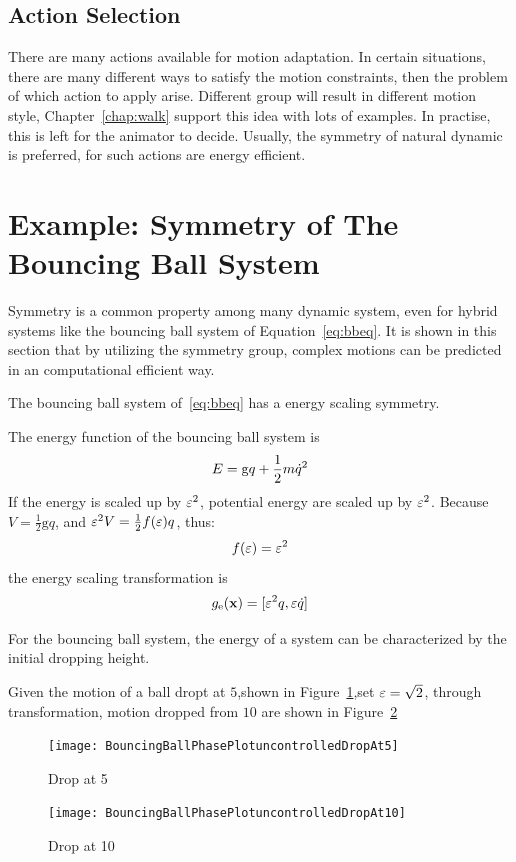 \subsection{Action Selection}
There are many actions available for motion adaptation.
In certain situations, there are many different ways to satisfy the motion constraints, then the problem of which action to apply arise.
Different group will result in different motion style, Chapter~\ref{chap:walk} support this idea with lots of examples.
In practise, this is left for the animator to decide.
Usually, the symmetry of natural dynamic is preferred, for such actions are energy efficient.







\section{Example: Symmetry of The Bouncing Ball System}
\label{sec:symball}
Symmetry is a common property among many dynamic system, even for hybrid systems like the bouncing ball system of Equation~\ref{eq:bbeq}.
It is shown in this section that by utilizing the symmetry group, complex motions can be predicted in an computational efficient way.

The bouncing ball system of~\ref{eq:bbeq} has a energy scaling symmetry.

The energy function of the bouncing ball system is  
\[
E=\mathrm{g}q+\frac{1}{2}m\dot{q}^2
\]
If the energy is scaled up by $\varepsilon^2$,  potential energy are scaled up by $\varepsilon^2$.
 Because $V= \frac{1}{2}\mathrm{g}q$, and $\varepsilon^2 V=\frac{1}{2}f(\varepsilon)q$, thus:
\[
f(\varepsilon)=\varepsilon^2
\]
the energy scaling transformation is
\[
g_{\mathrm{e}}(\mathbf{x})=[\varepsilon^2 q, \varepsilon \dot{q}]
\]

For the bouncing ball system, the energy of a system can be characterized by the initial dropping height.

Given the motion of a ball dropt at $5$,shown in Figure~\ref{fig:bouncing5},set $\varepsilon=\sqrt{2}$, through transformation, motion dropped from $10$ are shown in Figure~\ref{fig:bouncing10}
\begin{figure}[!htbp]
  \begin{center}
      \texttt{[image: BouncingBallPhasePlotuncontrolledDropAt5]}
    \caption{Drop at 5}
    \label{fig:bouncing5}
\end{center}
\end{figure}


\begin{figure}[!htbp]
  \begin{center}
      \texttt{[image: BouncingBallPhasePlotuncontrolledDropAt10]}
    \caption{Drop at 10}
    \label{fig:bouncing10}
\end{center}
\end{figure}




